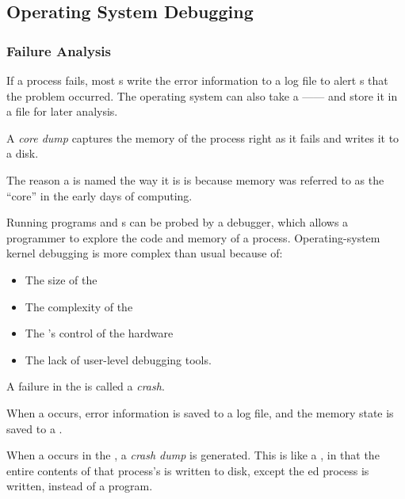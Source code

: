 \subsection{Operating System Debugging}\label{subsec:OS_Debugging}
\subsubsection{Failure Analysis}\label{subsubsec:Failure_Analysis}
If a process fails, most s write the error information to a log file to alert s that the problem occurred.
The operating system can also take a —— and store it in a file for later analysis.

\begin{definition}\label{def:Core_Dump}
  A \emph{core dump} captures the memory of the process right as it fails and writes it to a disk.

  \begin{remark}\label{rmk:Why_Core_Dump}
    The reason a  is named the way it is is because memory was referred to as the ``core'' in the early days of computing.
  \end{remark}
\end{definition}

Running programs and s can be probed by a debugger, which allows a programmer to explore the code and memory of a process.
Operating-system kernel debugging is more complex than usual because of:
\begin{itemize}[noitemsep]
\item The size of the 
\item The complexity of the 
\item The 's control of the hardware
\item The lack of user-level debugging tools.
\end{itemize}


\begin{definition}[Crash]\label{def:Crash}
  A failure in the  is called a \emph{crash}.
\end{definition}

When a  occurs, error information is saved to a log file, and the memory state is saved to a .

\begin{definition}\label{def:Crash_Dump}
  When a  occurs in the , a \emph{crash dump} is generated.
  This is like a , in that the entire contents of that process's  is written to disk, except the ed  process is written, instead of a  program.
\end{definition}


